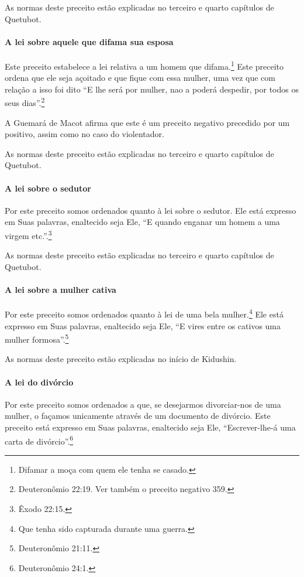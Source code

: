 As normas deste preceito estão explicadas no terceiro e quarto
capítulos de Quetubot.

\paragraph{A lei sobre aquele que difama sua esposa}

Este preceito estabelece a lei relativa a um homem que
difama.\footnote{Difamar a moça com quem ele tenha se casado.} Este preceito ordena que ele seja açoitado
e que fique com essa mulher, uma vez que com relação a isso foi dito ``E
lhe será por mulher, nao a poderá despedir, por todos os seus dias''.\footnote{Deuteronômio 22:19. Ver também o preceito negativo 359.}

A Guemará de Macot afirma que este é um preceito negativo precedido por
um positivo, assim como no caso do violentador.

As normas deste preceito estão explicadas no terceiro e quarto
capítulos de Quetubot.

\paragraph{A lei sobre o sedutor}

Por este preceito somos ordenados quanto à lei sobre o sedutor. Ele está
expresso em Suas palavras, enaltecido seja Ele, ``E quando enganar um
homem a uma virgem etc.''.\footnote{Êxodo 22:15.}

As normas deste preceito estão explicadas no terceiro e quarto
capítulos de Quetubot.

\paragraph{A lei sobre a mulher cativa}

Por este preceito somos ordenados quanto à lei de uma bela
mulher.\footnote{Que tenha sido capturada durante uma guerra.} Ele está expresso em Suas palavras,
enaltecido seja Ele, ``E vires entre os cativos uma mulher formosa''.\footnote{Deuteronômio 21:11.}

As normas deste preceito estão explicadas no início de Kidushin.

\paragraph{A lei do divórcio}

Por este preceito somos ordenados a que, se desejarmos divorciar-nos de
uma mulher, o façamos unicamente através de um documento de divórcio.
Este preceito está expresso em Suas palavras, enaltecido seja Ele,
``Escrever-lhe-á uma carta de divórcio''.\footnote{Deuteronômio 24:1.}

